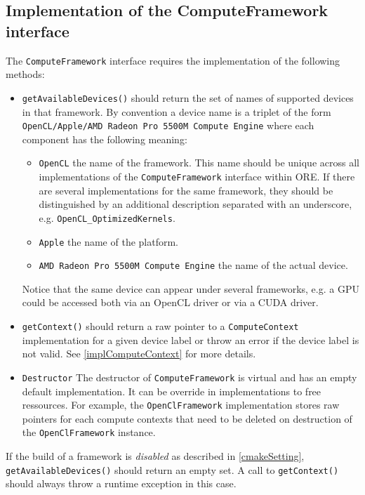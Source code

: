 \documentclass[12pt, a4paper]{article}
\begin{document}
\subsection{Implementation of the ComputeFramework interface}\label{implComputeFramework}

The \verb+ComputeFramework+ interface requires the implementation of the following methods:

\begin{itemize}
\item \verb+getAvailableDevices()+ should return the set of names of supported devices in that framework. By convention
  a device name is a triplet of the form \verb+OpenCL/Apple/AMD Radeon Pro 5500M Compute Engine+ where each component
  has the following meaning:
  \begin{itemize}
    \item \verb+OpenCL+ the name of the framework. This name should be unique across all implementations of the
      \verb+ComputeFramework+ interface within ORE. If there are several implementations for the same framework, they
      should be distinguished by an additional description separated with an underscore,
      e.g. \verb+OpenCL_OptimizedKernels+.
    \item \verb+Apple+ the name of the platform.
    \item \verb+AMD Radeon Pro 5500M Compute Engine+ the name of the actual device.
  \end{itemize}
  Notice that the same device can appear under several frameworks, e.g. a GPU could be accessed both via an OpenCL
  driver or via a CUDA driver.
\item \verb+getContext()+ should return a raw pointer to a \verb+ComputeContext+ implementation for a given device label
  or throw an error if the device label is not valid. See \ref{implComputeContext} for more details.
\item \verb+Destructor+ The destructor of \verb+ComputeFramework+ is virtual and has an empty default implementation. It
  can be override in implementations to free ressources. For example, the \verb+OpenClFramework+ implementation stores
  raw pointers for each compute contexts that need to be deleted on destruction of the \verb+OpenClFramework+ instance.
\end{itemize}

If the build of a framework is {\em disabled} as described in \ref{cmakeSetting}, \verb+getAvailableDevices()+ should
return an empty set. A call to \verb+getContext()+ should always throw a runtime exception in this case.
\end{document}
